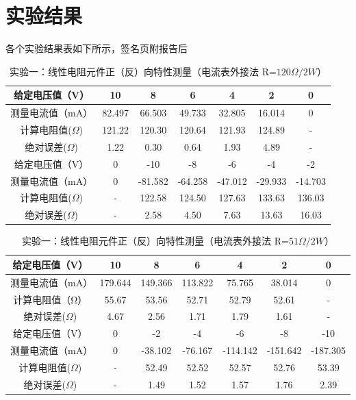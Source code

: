 \documentclass[a4paper]{article}
\begin{document}
\section{实验结果}
    \songti{} 各个实验结果表如下所示，签名页附报告后\par
    \begin{table}[!ht]
        \caption{实验一：线性电阻元件正（反）向特性测量（电流表外接法 R=$120\Omega/2W$）}\label{tab:exp4}
        \begin{tabularx}{\textwidth}{c*{6}{C}} \toprule
            给定电压值（V） & 10 & 8 & 6 & 4 & 2 & 0 \\ \midrule
            测量电流值（mA） & 82.497 & 66.503 & 49.733 & 32.805 & 16.014 & 0 \\计算电阻值($\Omega $) & 121.22 & 120.30 & 120.64 & 121.93 & 124.89 & - \\ 绝对误差($\Omega $) & 1.22 & 0.30 & 0.64 & 1.93 & 4.89 & - \\ \midrule 给定电压值（V）& 0  & -10 & -8 & -6 & -4 & -2 \\ \midrule 测量电流值（mA）& 0  & -81.582 & -64.258 & -47.012 & -29.933 & -14.703 \\计算电阻值($\Omega $) & -  & 122.58 & 124.50 & 127.63 & 133.63 & 136.03\\ 绝对误差($\Omega $) & -  & 2.58 & 4.50 & 7.63 & 13.63 & 16.03 \\
            \bottomrule
        \end{tabularx}
    \end{table}
    \begin{table}[!ht]
        \caption{实验一：线性电阻元件正（反）向特性测量（电流表外接法 R=$51\Omega/2W$）}\label{tab:exp4}
        \begin{tabularx}{\textwidth}{c*{6}{C}} \toprule
            给定电压值（V） & 10 & 8 & 6 & 4 & 2 & 0 \\ \midrule
            测量电流值（mA） & 179.644 & 149.366 & 113.822 & 75.765 & 38.014 & 0 \\ 计算电阻值（Ω） & 55.67 & 53.56 & 52.71 & 52.79 & 52.61 & - \\ 绝对误差($\Omega $) & 4.67 & 2.56 & 1.71 & 1.79 & 1.61 & - \\ \midrule 给定电压值（V） & 0 & -2 & -4 & -6 & -8 & -10 \\ \midrule 测量电流值（mA） & 0 & -38.102 & -76.167 & -114.142 & -151.642 & -187.305 \\ 计算电阻值($\Omega $) & - & 52.49 & 52.52 & 52.57 & 52.76 & 53.39 \\ 绝对误差($\Omega $) & - & 1.49 & 1.52 & 1.57 & 1.76 & 2.39 \\
            \bottomrule
        \end{tabularx}
    \end{table}
\end{document}
